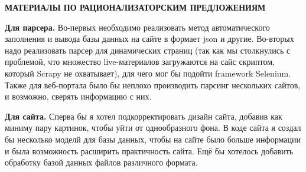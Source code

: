 \begin{center}
\bfseries{\large МАТЕРИАЛЫ ПО РАЦИОНАЛИЗАТОРСКИМ ПРЕДЛОЖЕНИЯМ}
\end{center}

\textbf{Для парсера.} Во-первых необходимо реализовать метод автоматического заполнения и вывода базы данных на сайте в формает json и другие. Во-вторых надо реализовать парсер для динамических страниц (так как мы столкнулись с проблемой, что множество live-материалов загружаются на сайс скриптом, который Scrapy не охватывает), для чего мог бы подойти framework Selenium. Также для веб-портала было бы неплохо производить парсинг нескольких сайтов, и возможно, сверять информацию с них.

\textbf{Для сайта.} Сперва бы я хотел подкорректировать дизайн сайта, добавив как миниму пару картинок, чтобы уйти от однообразного фона. В коде сайта я создал бы несколько моделй для базы данных, чтобы на сайте было больше информации и была возможность расширить практичность сайта. Ещё бы хотелось добавить обработку базой данных файлов различного формата.

\pagebreak
